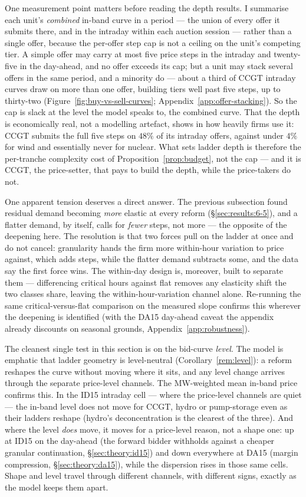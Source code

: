 \documentclass[11pt,a4paper]{article}
\theoremstyle{definition}
\theoremstyle{remark}
\theoremstyle{plain}
\begin{document}
One measurement point matters before reading the depth results. I summarise each unit's \emph{combined} in-band curve in a period --- the union of every offer it submits there, and in the intraday within each auction session --- rather than a single offer, because the per-offer step cap is not a ceiling on the unit's competing tier. A simple offer may carry at most five price steps in the intraday and twenty-five in the day-ahead, and no offer exceeds its cap; but a unit may stack several offers in the same period, and a minority do --- about a third of CCGT intraday curves draw on more than one offer, building tiers well past five steps, up to thirty-two (Figure~\ref{fig:buy-vs-sell-curves}; Appendix~\ref{app:offer-stacking}). So the cap is slack at the level the model speaks to, the combined curve. That the depth is economically real, not a modelling artefact, shows in how heavily firms use it: CCGT submits the full five steps on $48\%$ of its intraday offers, against under $4\%$ for wind and essentially never for nuclear. What sets ladder depth is therefore the per-tranche complexity cost of Proposition~\ref{prop:budget}, not the cap --- and it is CCGT, the price-setter, that pays to build the depth, while the price-takers do not.

One apparent tension deserves a direct answer. The previous subsection found residual demand becoming \emph{more} elastic at every reform (\S\ref{sec:results:6-5}), and a flatter demand, by itself, calls for \emph{fewer} steps, not more --- the opposite of the deepening here. The resolution is that two forces pull on the ladder at once and do not cancel: granularity hands the firm more within-hour variation to price against, which adds steps, while the flatter demand subtracts some, and the data say the first force wins. The within-day design is, moreover, built to separate them --- differencing critical hours against flat removes any elasticity shift the two classes share, leaving the within-hour-variation channel alone. Re-running the same critical-versus-flat comparison on the measured slope confirms this wherever the deepening is identified (with the DA15 day-ahead caveat the appendix already discounts on seasonal grounds, Appendix~\ref{app:robustness}).

The cleanest single test in this section is on the bid-curve \emph{level}. The model is emphatic that ladder geometry is level-neutral (Corollary~\ref{rem:level}): a reform reshapes the curve without moving where it sits, and any level change arrives through the separate price-level channels. The MW-weighted mean in-band price confirms this. In the ID15 intraday cell --- where the price-level channels are quiet --- the in-band level does not move for CCGT, hydro or pump-storage even as their ladders reshape (hydro's deconcentration is the clearest of the three). And where the level \emph{does} move, it moves for a price-level reason, not a shape one: up at ID15 on the day-ahead (the forward bidder withholds against a cheaper granular continuation, \S\ref{sec:theory:id15}) and down everywhere at DA15 (margin compression, \S\ref{sec:theory:da15}), while the dispersion rises in those same cells.
 Shape and level travel through different channels, with different signs, exactly as the model keeps them apart.
\end{document}

